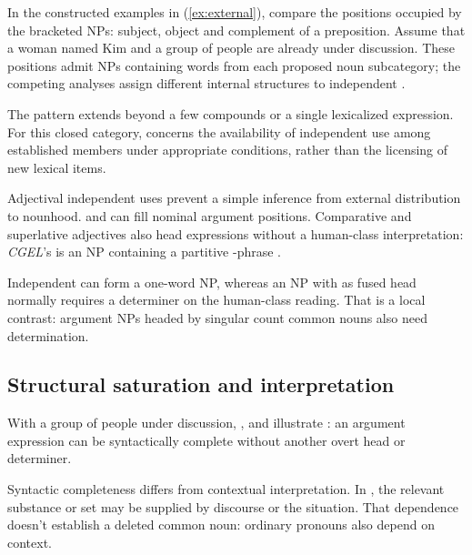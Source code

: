 \documentclass[12pt]{article}
\begin{document}
In the constructed examples in (\ref{ex:external}), compare the positions occupied by the bracketed NPs: subject, object and complement of a preposition. Assume that a woman named Kim and a group of people are already under discussion. These positions admit NPs containing words from each proposed noun subcategory; the competing analyses assign different internal structures to independent .

\begin{samepage}
\ea\label{ex:external}
\ea {}\qquad {}\qquad {}
\ex {}\qquad {}\qquad {}
\ex {}\qquad {}\qquad {}
\ex {}\qquad {}\qquad {}
\z\z
\end{samepage}

The pattern extends beyond a few compounds or a single lexicalized expression. For this closed category,  concerns the availability of independent use among established members under appropriate conditions, rather than the licensing of new lexical items.

Adjectival independent uses prevent a simple inference from external distribution to nounhood.  and  can fill nominal argument positions. Comparative and superlative adjectives also head expressions without a human-class interpretation: \textit{CGEL}'s  is an NP containing a partitive -phrase \citep[332--333, 416--423]{huddleston2002}.

Independent  can form a one-word NP, whereas an NP with  as fused head normally requires a determiner on the human-class reading. That is a local contrast: argument NPs headed by singular count common nouns also need determination.

\subsection{Structural saturation and interpretation}

With a group of people under discussion, ,  and  illustrate : an argument expression can be syntactically complete without another overt head or determiner.

Syntactic completeness differs from contextual interpretation. In , the relevant substance or set may be supplied by discourse or the situation. That dependence doesn't establish a deleted common noun: ordinary pronouns also depend on context.
\end{document}
